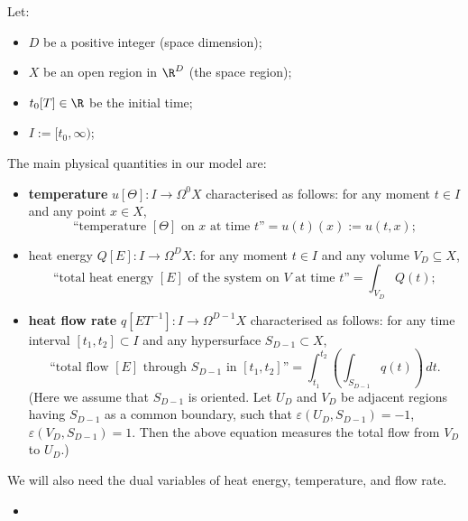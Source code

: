 \begin{discussion}
  \label{cmc/diffusion/continuous/model_with_differential_forms-discussion}
  Let:
  \begin{itemize}
    \item
      $D$ be a positive integer (space dimension);
    \item
      $X$ be an open region in $\R^D$ (the space region);
    \item
      $t_0 [T] \in \R$ be the initial time;
    \item
      $I := [t_0, \infty)$;
  \end{itemize}
  The main physical quantities in our model are:
  \begin{itemize}
    \item
      \textbf{temperature}
      $u [\Theta] \colon I \to \Omega^0 X$ characterised as follows:
      for any moment $t \in I$ and any point $x \in X$,
      \begin{equation}
        \text{``temperature $[\Theta]$ on $x$ at time $t$''}
        = u(t)(x) := u(t, x);
      \end{equation}
    \item
      heat energy $Q [E] \colon I \to \Omega^D X$:
      for any moment $t \in I$ and any volume $V_D \subseteq X$,
      \begin{equation}
        \text{``total heat energy $[E]$ of the system on $V$ at time $t$''}
        = \int_{V_D} Q(t);
      \end{equation}
    \item
      \textbf{heat flow rate}
      $q [E T^{-1}] \colon I \to \Omega^{D - 1} X$ characterised as follows:
      for any time interval $[t_1, t_2] \subset I$
      and any hypersurface $S_{D - 1} \subset X$,
      \begin{equation}
        \text{``total flow $[E]$ through $S_{D - 1}$ in $[t_1, t_2]$''}
        = \int_{t_1}^{t_2}\left(\int_{S_{D - 1}} q(t)\right)\, d t.
      \end{equation}
      (Here we assume that $S_{D - 1}$ is oriented.
       Let $U_D$ and $V_D$ be adjacent regions having $S_{D - 1}$ as a common
       boundary, such that $\varepsilon(U_D, S_{D - 1}) = -1$,
       $\varepsilon(V_D, S_{D - 1}) = 1$.
       Then the above equation measures the total flow from $V_D$ to $U_D$.)
  \end{itemize}
  We will also need the dual variables of heat energy, temperature, and
  flow rate.
  \begin{itemize}
    \item

\end{itemize}
\end{discussion}
